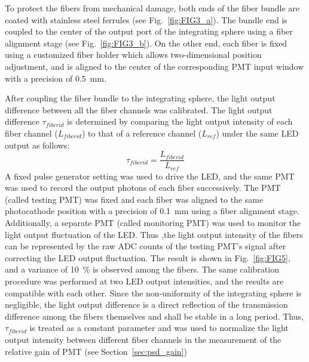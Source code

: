 \documentclass{nst}
\begin{document}
To protect the fibers from mechanical damage, both ends of the fiber bundle are coated with stainless steel ferrules (see Fig.~\ref{fig:FIG3_a}).
The bundle end is coupled to the center of the output port of the integrating sphere using a fiber alignment stage (see Fig.~\ref{fig:FIG3_b}).
On the other end, each fiber is fixed using a customized fiber holder which allows two-dimensional position adjustment, and is aligned to the center of the corresponding PMT input window with a precision of \SI{0.5}{\milli\meter}.

After coupling the fiber bundle to the integrating sphere, the light output difference between all the fiber channels was calibrated. 
The light output difference $\tau_{fiberid}$ is determined by comparing the light output intensity of each fiber channel ($L_{fiberid}$) to that of a reference channel ($L_{ref}$) under the same LED output as follows:
\begin{equation}
	\tau_{fiberid} = \frac{L_{fiberid}}{L_{ref}}
\end{equation} 
A fixed pulse generator setting was used to drive the LED, and the same PMT was used to record the output photons of each fiber successively.
The PMT (called testing PMT) was fixed and each fiber was aligned to the same photocathode position with a precision of \SI{0.1}{\milli\meter} using a fiber alignment stage.
Additionally, a separate PMT (called monitoring PMT) was used to monitor the light output fluctuation of the LED.
Thus ,the light output intensity of the fibers can be represented by the raw ADC counts of the testing PMT's signal after correcting the LED output fluctuation.
The result is shown in Fig.~\ref{fig:FIG5}, and a variance of \SI{10}{\percent} is observed among the fibers.
The same calibration procedure was performed at two LED output intensities, and the results are compatible with each other. 
Since the non-uniformity of the integrating sphere is negligible, the light output difference is a direct reflection of the transmission difference among the fibers themselves and shall be stable in a long period.
Thus, $\tau_{fiberid}$ is treated as a constant parameter and was used to normalize the light output intensity between different fiber channels in the measurement of the relative gain of PMT (see Section~\ref{sec:psd_gain})
\end{document}
